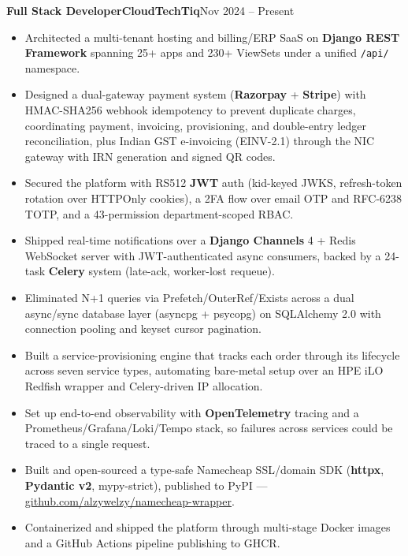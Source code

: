 \documentclass[11pt,a4paper]{article}
\newcommand{\entry}[3]{%
  \vspace{4.5pt}\noindent\textbf{#1}\hfill\textbf{#2}\hfill{\color{subtlegray}#3}\par\vspace{2pt}}
\begin{document}
\entry{Full Stack Developer}{CloudTechTiq}{Nov 2024 -- Present}
\begin{itemize}
  \item Architected a multi-tenant hosting and billing/ERP SaaS on \textbf{Django
        REST Framework} spanning 25+ apps and 230+ ViewSets under a unified
        \texttt{/api/} namespace.
  \item Designed a dual-gateway payment system (\textbf{Razorpay} +
        \textbf{Stripe}) with HMAC-SHA256 webhook idempotency to prevent duplicate
        charges, coordinating payment, invoicing, provisioning, and double-entry
        ledger reconciliation, plus Indian GST e-invoicing (EINV-2.1) through the
        NIC gateway with IRN generation and signed QR codes.
  \item Secured the platform with RS512 \textbf{JWT} auth (kid-keyed JWKS,
        refresh-token rotation over HTTPOnly cookies), a 2FA flow over email OTP
        and RFC-6238 TOTP, and a 43-permission department-scoped RBAC.
  \item Shipped real-time notifications over a \textbf{Django Channels} 4 + Redis
        WebSocket server with JWT-authenticated async consumers, backed by a
        24-task \textbf{Celery} system (late-ack, worker-lost requeue).
  \item Eliminated N+1 queries via Prefetch/OuterRef/Exists across a dual
        async/sync database layer (asyncpg + psycopg) on SQLAlchemy 2.0 with
        connection pooling and keyset cursor pagination.
  \item Built a service-provisioning engine that tracks each order through its
        lifecycle across seven service types, automating bare-metal setup over an
        HPE iLO Redfish wrapper and Celery-driven IP allocation.
  \item Set up end-to-end observability with \textbf{OpenTelemetry} tracing and a
        Prometheus/Grafana/Loki/Tempo stack, so failures across services could be
        traced to a single request.
  \item Built and open-sourced a type-safe Namecheap SSL/domain SDK
        (\textbf{httpx}, \textbf{Pydantic v2}, mypy-strict), published to PyPI ---
        \href{https://github.com/alzywelzy/namecheap-wrapper}{github.com/alzywelzy/namecheap-wrapper}.
  \item Containerized and shipped the platform through multi-stage Docker images
        and a GitHub Actions pipeline publishing to GHCR.
\end{itemize}
\end{document}
